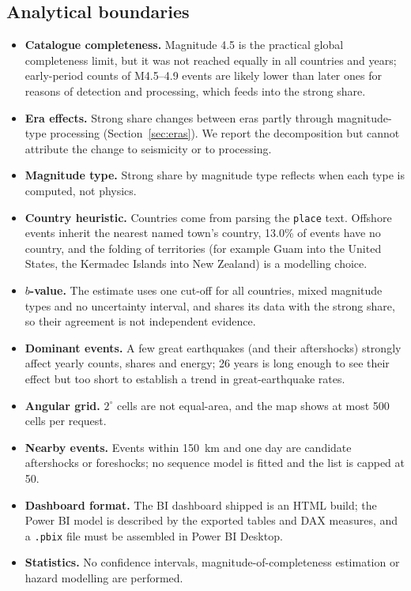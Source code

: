 \documentclass[11pt,a4paper]{article}
\begin{document}
\subsection{Analytical boundaries}
\begin{itemize}
\item \textbf{Catalogue completeness.} Magnitude 4.5 is the practical global completeness limit, but it was not reached equally in all countries and years; early-period counts of M4.5--4.9 events are likely lower than later ones for reasons of detection and processing, which feeds into the strong share.
\item \textbf{Era effects.} Strong share changes between eras partly through magnitude-type processing (Section~\ref{sec:eras}). We report the decomposition but cannot attribute the change to seismicity or to processing.
\item \textbf{Magnitude type.} Strong share by magnitude type reflects when each type is computed, not physics.
\item \textbf{Country heuristic.} Countries come from parsing the \texttt{place} text. Offshore events inherit the nearest named town's country, 13.0\% of events have no country, and the folding of territories (for example Guam into the United States, the Kermadec Islands into New Zealand) is a modelling choice.
\item \textbf{$b$-value.} The estimate uses one cut-off for all countries, mixed magnitude types and no uncertainty interval, and shares its data with the strong share, so their agreement is not independent evidence.
\item \textbf{Dominant events.} A few great earthquakes (and their aftershocks) strongly affect yearly counts, shares and energy; 26 years is long enough to see their effect but too short to establish a trend in great-earthquake rates.
\item \textbf{Angular grid.} $2^\circ$ cells are not equal-area, and the map shows at most 500 cells per request.
\item \textbf{Nearby events.} Events within 150~km and one day are candidate aftershocks or foreshocks; no sequence model is fitted and the list is capped at 50.
\item \textbf{Dashboard format.} The BI dashboard shipped is an HTML build; the Power BI model is described by the exported tables and DAX measures, and a \texttt{.pbix} file must be assembled in Power BI Desktop.
\item \textbf{Statistics.} No confidence intervals, magnitude-of-completeness estimation or hazard modelling are performed.
\end{itemize}
\end{document}
